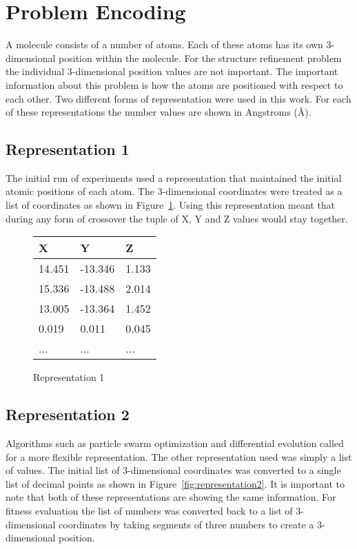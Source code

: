 \section{Problem Encoding}

A molecule consists of a number of atoms. Each of these atoms has its own 3-dimensional position within the molecule. For the structure refinement problem the individual 3-dimensional position values are not important. The important information about this problem is how the atoms are positioned with respect to each other. Two different forms of representation were used in this work. For each of these representations the number values are shown in Angstroms (\AA).

\subsection{Representation 1}
\label{subsec:encoding-1}

The initial run of experiments used a representation that maintained the initial atomic positions of each atom. The 3-dimensional coordinates were treated as a list of coordinates as shown in Figure~\ref{fig:representation1}. Using this representation meant that during any form of crossover the tuple of X, Y and Z values would stay together.

\begin{figure}
	\centering
	\begin{tabular}{ | l | l | l | }
		\hline
		X & Y & Z \\ \hline
		14.451 & -13.346 & 1.133 \\ \hline
		15.336 & -13.488 & 2.014 \\ \hline
		13.005 & -13.364 & 1.452 \\ \hline
		0.019 & 0.011 & 0.045 \\ \hline
		... & ... & ... \\ \hline
	\end{tabular}
	\caption{Representation 1}
	\label{fig:representation1}
\end{figure}

\subsection{Representation 2}
\label{subsec:encoding-2}

Algorithms such as particle swarm optimization and differential evolution called for a more flexible representation. The other representation used was simply a list of values. The initial list of 3-dimensional coordinates was converted to a single list of decimal points as shown in Figure~\ref{fig:representation2}. It is important to note that both of these representations are showing the same information. For fitness evaluation the list of numbers was converted back to a list of 3-dimensional coordinates by taking segments of three numbers to create a 3-dimensional position.

